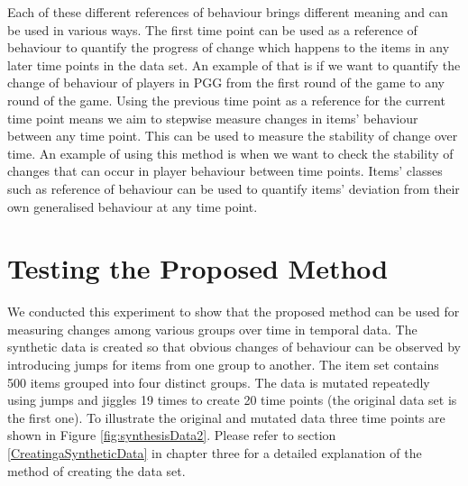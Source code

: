 Each of these different references of behaviour brings different meaning and can be used in various ways. The first time point can be used as a reference of behaviour to quantify the progress of change which happens to the items in any later time points in the data set. An example of that is if we want to quantify the change of behaviour of players in PGG from the first round of the game to any round of the game.     Using the previous time point as a reference for the current time point means we aim to stepwise measure changes in items' behaviour between any time point. This can be used to measure the stability of change over time. An example of using this method is when we want to check the stability of changes that can occur in player behaviour between time points. Items' classes such as reference of behaviour can be used to quantify items' deviation from their own generalised behaviour at any time point.
         
         
         
 \section{Testing the Proposed Method}
         
We conducted this experiment to show that the proposed method can be used for measuring changes among various groups over time in temporal data. The synthetic data is created so that obvious changes of behaviour can be observed by introducing jumps for items from one group to another. The item set contains 500 items grouped into four distinct groups. The data is mutated repeatedly using jumps and jiggles 19 times to create 20 time points (the original data set is the first one). To illustrate the original and mutated data three time points are shown in Figure \ref{fig:synthesisData2}. Please refer to section \ref{CreatingaSyntheticData} in chapter three for a detailed explanation of the method of creating the data set.
         
